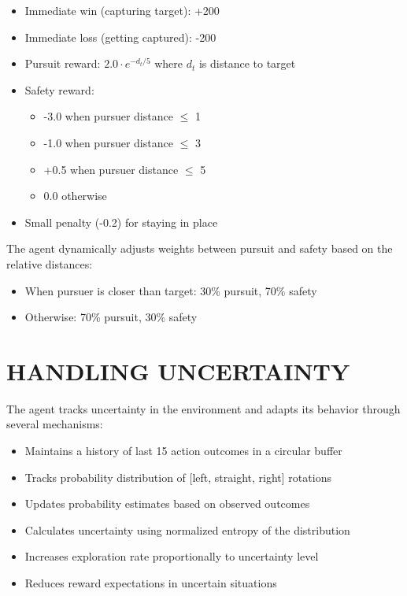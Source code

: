 \documentclass[letterpaper, 10 pt, conference]{ieeeconf}
\begin{document}
\begin{itemize}
    \item Immediate win (capturing target): +200
    \item Immediate loss (getting captured): -200
    \item Pursuit reward: $2.0 \cdot e^{-d_t/5}$ where $d_t$ is distance to target
    \item Safety reward:
    \begin{itemize}
        \item -3.0 when pursuer distance $\leq$ 1
        \item -1.0 when pursuer distance $\leq$ 3
        \item +0.5 when pursuer distance $\leq$ 5
        \item 0.0 otherwise
    \end{itemize}
    \item Small penalty (-0.2) for staying in place
\end{itemize}

The agent dynamically adjusts weights between pursuit and safety based on the relative distances:
\begin{itemize}
    \item When pursuer is closer than target: 30\% pursuit, 70\% safety
    \item Otherwise: 70\% pursuit, 30\% safety
\end{itemize}

\section{HANDLING UNCERTAINTY}
The agent tracks uncertainty in the environment and adapts its behavior through several mechanisms:
\begin{itemize}
    \item Maintains a history of last 15 action outcomes in a circular buffer
    \item Tracks probability distribution of [left, straight, right] rotations
    \item Updates probability estimates based on observed outcomes
    \item Calculates uncertainty using normalized entropy of the distribution
    \item Increases exploration rate proportionally to uncertainty level
    \item Reduces reward expectations in uncertain situations
\end{itemize}
\end{document}
